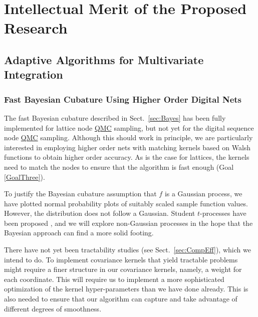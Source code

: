 \documentclass[11pt]{NSFamsart}
\newcommand{\QMC}{\hyperlink{QMClink}{QMC}\xspace}
\begin{document}
\section{Intellectual Merit of the Proposed Research} \label{sec:Proposed}


\subsection{Adaptive Algorithms for Multivariate Integration}\label{SectMultiInt}

\subsubsection{Fast Bayesian Cubature Using Higher Order Digital Nets}  \label{sec:NewBayes}

The fast Bayesian cubature  described in Sect.\ \ref{sec:Bayes} \cite{RatHic19a} has been fully implemented for lattice node \QMC sampling, but not yet for the digital sequence node \QMC sampling.  Although this should work in principle, we are particularly interested in employing higher order nets with matching kernels based on Walsh functions to obtain higher order accuracy.  As is the case for lattices, the kernels need to match the nodes to ensure that the algorithm is fast enough (Goal \ref{GoalThree}).

To justify the Bayesian cubature assumption that $f$ is a Gaussian process, we have plotted normal probability plots of suitably scaled sample function values.  However, the distribution does not follow a Gaussian.  Student $t$-processes have been proposed \cite{ShaWilGha14a}, and we will explore non-Gaussian processes in the hope that the Bayesian approach can find a more solid footing.

There have not yet been tractability studies (see Sect.\ \ref{sec:CompEff}), which we intend to do. To implement covariance kernels that yield tractable problems might require a finer structure in our covariance kernels, namely, a weight for each coordinate.  This will require us to implement a more  sophisticated optimization of the kernel hyper-parameters than we have done already.  This is also needed to ensure that our algorithm can capture and take advantage of different degrees of smoothness.
\end{document}
